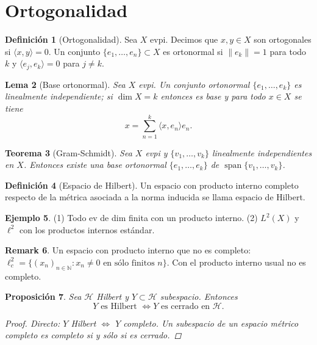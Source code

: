 \documentclass[11pt]{article}
\theoremstyle{definition}
\newtheorem{definition}{Definición}[section]
\newtheorem{example}[definition]{Ejemplo}
\newtheorem{remark}[definition]{Remark}
\theoremstyle{plain}
\newtheorem{lemma}[definition]{Lema}
\newtheorem{proposition}[definition]{Proposición}
\newtheorem{theorem}[definition]{Teorema}
\begin{document}
\section*{Ortogonalidad}

\begin{definition}[Ortogonalidad]
Sea $X$ evpi. Decimos que $x,y\in X$ son ortogonales si $\langle x,y\rangle=0$. Un conjunto $\{e_1,\dots,e_n\}\subset X$ es ortonormal si $\|e_k\|=1$ para todo $k$ y $\langle e_j,e_k\rangle=0$ para $j\neq k$.
\end{definition}

\begin{lemma}[Base ortonormal]
Sea $X$ evpi. Un conjunto ortonormal $\{e_1,\dots,e_k\}$ es linealmente independiente; si $\dim X=k$ entonces es base y para todo $x\in X$ se tiene
\[x=\sum_{n=1}^k\langle x,e_n\rangle e_n.\]
\end{lemma}

\begin{theorem}[Gram-Schmidt]
Sea $X$ evpi y $\{v_1,\dots,v_k\}$ linealmente independientes en $X$. Entonces existe una base ortonormal $\{e_1,\dots,e_k\}$ de $\operatorname{span}\{v_1,\dots,v_k\}$.
\end{theorem}

\begin{definition}[Espacio de Hilbert]
Un espacio con producto interno completo respecto de la métrica asociada a la norma inducida se llama espacio de Hilbert.
\end{definition}

\begin{example}
(1) Todo ev de dim finita con un producto interno.
(2) $L^2(X)$ y $\ell^2$ con los productos internos estándar.
\end{example}

\begin{remark}
Un espacio con producto interno que no es completo: $\ell^2_c=\{(x_n)_{n\in\mathbb{N}}:x_n\neq0\text{ en sólo finitos }n\}$. Con el producto interno usual no es completo.
\end{remark}

\begin{proposition}
Sea $\mathcal{H}$ Hilbert y $Y\subset\mathcal{H}$ subespacio. Entonces
\[Y\text{ es Hilbert }\iff Y\text{ es cerrado en }\mathcal{H}.\]
\begin{proof}
Directo: $Y$ Hilbert $\iff$ $Y$ completo. Un subespacio de un espacio métrico completo es completo si y sólo si es cerrado.
\end{proof}
\end{proposition}
\end{document}
